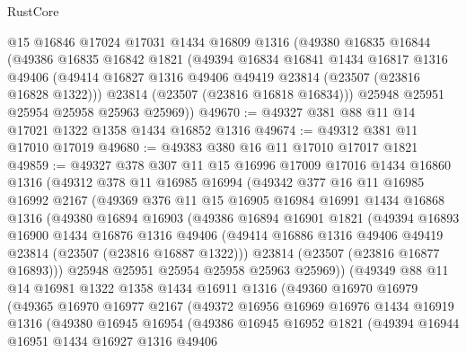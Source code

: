 \begin{lexlean}{RustCore}
\begin{coremodule}
    @15
    @16846
    @17024
    @17031
    @1434
    @16809
    @1316
    (@49380
      @16835
      @16844
      (@49386
        @16835
        @16842
        @1821
        (@49394
          @16834
          @16841
          @1434
          @16817
          @1316
          @49406
          (@49414 @16827 @1316 @49406 @49419 @23814 (@23507 (@23816 @16828 @1322)))
          @23814
          (@23507 (@23816 @16818 @16834)))
        @25948
        @25951
        @25954
        @25958
        @25963
        @25969))
@49670 := @49327 @381 @88 @11 @14 @17021 @1322 @1358 @1434 @16852 @1316
@49674 := @49312 @381 @11 @17010 @17019
@49680 := @49383 @380 @16 @11 @17010 @17017 @1821
@49859 := @49327
    @378
    @307
    @11
    @15
    @16996
    @17009
    @17016
    @1434
    @16860
    @1316
    (@49312
      @378
      @11
      @16985
      @16994
      (@49342
        @377
        @16
        @11
        @16985
        @16992
        @2167
        (@49369
          @376
          @11
          @15
          @16905
          @16984
          @16991
          @1434
          @16868
          @1316
          (@49380
            @16894
            @16903
            (@49386
              @16894
              @16901
              @1821
              (@49394
                @16893
                @16900
                @1434
                @16876
                @1316
                @49406
                (@49414 @16886 @1316 @49406 @49419 @23814 (@23507 (@23816 @16887 @1322)))
                @23814
                (@23507 (@23816 @16877 @16893)))
              @25948
              @25951
              @25954
              @25958
              @25963
              @25969))
          (@49349
            @88
            @11
            @14
            @16981
            @1322
            @1358
            @1434
            @16911
            @1316
            (@49360
              @16970
              @16979
              (@49365
                @16970
                @16977
                @2167
                (@49372
                  @16956
                  @16969
                  @16976
                  @1434
                  @16919
                  @1316
                  (@49380
                    @16945
                    @16954
                    (@49386
                      @16945
                      @16952
                      @1821
                      (@49394
                        @16944
                        @16951
                        @1434
                        @16927
                        @1316
                        @49406

\end{coremodule}
\end{lexlean}
